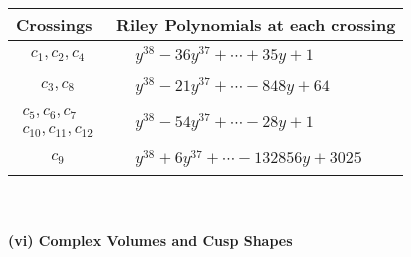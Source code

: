 \documentclass[1p]{elsarticle_modified}
\theoremstyle{definition}
\begin{document}
\begin{tabular}{m{50pt}|m{274pt}}
Crossings & \hspace{64pt}Riley Polynomials at each crossing \\
\hline $$\begin{aligned}c_{1},c_{2},c_{4}\end{aligned}$$&$\begin{aligned}
&y^{38}-36 y^{37}+\cdots+35 y+1
\end{aligned}$\\
\hline $$\begin{aligned}c_{3},c_{8}\end{aligned}$$&$\begin{aligned}
&y^{38}-21 y^{37}+\cdots-848 y+64
\end{aligned}$\\
\hline $$\begin{aligned}c_{5},c_{6},c_{7}\\c_{10},c_{11},c_{12}\end{aligned}$$&$\begin{aligned}
&y^{38}-54 y^{37}+\cdots-28 y+1
\end{aligned}$\\
\hline $$\begin{aligned}c_{9}\end{aligned}$$&$\begin{aligned}
&y^{38}+6 y^{37}+\cdots-132856 y+3025
\end{aligned}$\\
\hline
\end{tabular}\\~\\
\newpage\flushleft \textbf{(vi) Complex Volumes and Cusp Shapes}
\end{document}
